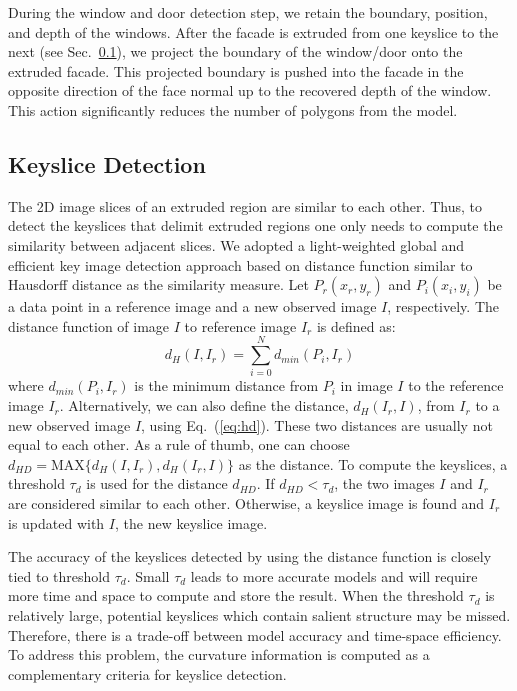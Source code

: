 \documentclass[10pt, conference, compsocconf]{IEEEtran}
\newcommand{\Eq}[1] {Eq.~(\ref{eq:#1})}
\newcommand{\Sec}[1]{Sec.~\ref{sec:#1}}
\begin{document}
During the window and door detection step, we retain the boundary, position,
and depth of the windows. 
After the facade is extruded from one keyslice to the next (see \Sec{ksd}),
we project the boundary of the window/door onto the extruded facade.
This projected boundary is pushed into the facade in the opposite direction
of the face normal up to the recovered depth of the window.
This action significantly reduces the number of polygons from the model.

\subsection{Keyslice Detection}
\label{sec:ksd}

The 2D image slices of an extruded region are similar to each other.
Thus, to detect the keyslices that delimit extruded regions one only needs
to compute the similarity between adjacent slices.
We adopted a light-weighted global and efficient key image detection approach
based on distance function similar to
Hausdorff distance as the similarity measure.
Let $P_r(x_r, y_r)$ and $P_i(x_i, y_i)$ be a data point in
a reference image and a new observed image $I$, respectively.
The distance function of image $I$ to reference image $I_r$ is defined as:
\begin{equation}
d_H(I, I_r) = \sum_{i=0}^Nd_{min}(P_i, I_r)
\label{eq:hd}
\end{equation}
where $d_{min}(P_i, I_r)$ is the minimum distance from $P_i$ in image $I$
to the reference image $I_r$.
Alternatively, we can also define the distance, $d_H(I_r, I)$,
from $I_r$ to a new observed image $I$, using \Eq{hd}.
These two distances are usually not equal to each other.
As a rule of thumb, one can choose
$d_{HD} = \text{MAX}\{d_H(I, I_r), d_H(I_r, I)\}$ as the distance.
To compute the keyslices, a threshold $\tau_{d}$ is used for the
distance $d_{HD}$.
If $d_{HD} < \tau_{d}$, the two images $I$ and $I_r$ are considered
similar to each other.
Otherwise, a keyslice image is found and $I_r$ is updated with $I$,
the new keyslice image.

The accuracy of the keyslices detected by using the distance function
is closely tied to threshold $\tau_d$.
Small $\tau_d$ leads to more accurate models and will require more time and
space to compute and store the result.
When the threshold $\tau_d$ is relatively large, potential keyslices which
contain salient structure may be missed.
Therefore, there is a trade-off between model accuracy and time-space
efficiency.
To address this problem, the curvature information is computed as a
complementary criteria for keyslice detection.
\end{document}
